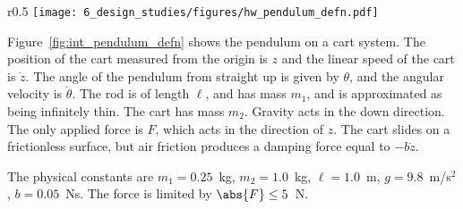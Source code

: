


\begin{wrapfigure}{r}{0.5\textwidth}
  \texttt{[image: 6\_design\_studies/figures/hw\_pendulum\_defn.pdf]}\\
  \caption{Pendulum on a cart.}
  \label{fig:int_pendulum_defn}
\end{wrapfigure}

Figure~\ref{fig:int_pendulum_defn} shows the pendulum on a cart system.  The position of the cart measured from the origin is $z$ and the linear speed of the cart is $\dot{z}$.  The angle of the pendulum from straight up is given by $\theta$, and the angular velocity is $\dot{\theta}$.  The rod is of length $\ell$, and has mass $m_1$, and is approximated as being infinitely thin. The cart has mass $m_2$.  Gravity acts in the down direction.  The only applied force is $F$, which acts in the direction of $z$.  The cart slides on a frictionless surface, but air friction produces a damping force equal to $-b\dot{z}$.

The physical constants are $m_1=0.25$~kg, $m_2=1.0$~kg, $\ell=1.0$~m, $g=9.8$~m/s$^2$, $b=0.05$~Ns.  The force is limited by $\abs{F}\leq 5$~N.
